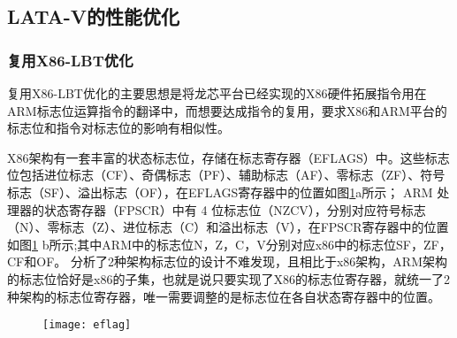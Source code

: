 \subsection{LATA-V的性能优化}
\subsubsection{复用X86-LBT优化}
复用X86-LBT优化的主要思想是将龙芯平台已经实现的X86硬件拓展指令用在ARM标志位运算指令的翻译中，而想要达成指令的复用，要求X86和ARM平台的标志位和指令对标志位的影响有相似性。

X86架构有一套丰富的状态标志位，存储在标志寄存器（EFLAGS）中。这些标志位包括进位标志（CF）、奇偶标志（PF）、辅助标志（AF）、零标志（ZF）、符号标志（SF）、溢出标志（OF），在EFLAGS寄存器中的位置如图\ref{fig:eflag}a所示；
ARM 处理器的状态寄存器（FPSCR）中有 4 位标志位（NZCV），分别对应符号标志（N）、零标志（Z）、进位标志（C）和溢出标志（V），在FPSCR寄存器中的位置如图\ref{fig:eflag} b所示;其中ARM中的标志位N，Z，C，V分别对应x86中的标志位SF，ZF，CF和OF。
分析了2种架构标志位的设计不难发现，且相比于x86架构，ARM架构的标志位恰好是x86的子集，也就是说只要实现了X86的标志位寄存器，就统一了2种架构的标志位寄存器，唯一需要调整的是标志位在各自状态寄存器中的位置。
\begin{figure}[!htbp]
    \centering
    \texttt{[image: eflag]}
    \label{fig:eflag}
\end{figure}

